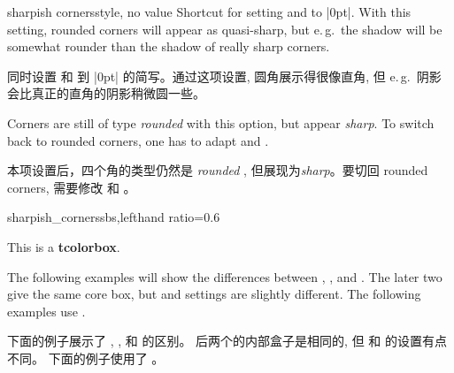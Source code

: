 \begin{docTcbKey}{sharpish corners}{}{style, no value}
Shortcut for setting  and 
to |0pt|. With this setting, rounded corners will appear as quasi-sharp,
but e.\,g.\ the shadow will be somewhat rounder than the shadow
of really sharp corners.

同时设置  和  到 |0pt| 的简写。通过这项设置, 圆角展示得很像直角, 但 e.\,g.\ 阴影会比真正的直角的阴影稍微圆一些。
\begin{marker}
Corners are still of type \emph{rounded} with this option, but appear
\emph{sharp}. To switch back to rounded corners, one has to adapt
 and .

本项设置后，四个角的类型仍然是 \emph{rounded} , 但展现为\emph{sharp}。要切回 rounded corners, 需要修改  和 。
\end{marker}
\begin{exdispExample*}{sharpish_corners}{sbs,lefthand ratio=0.6}
\begin{tcolorbox}[colback=red!5!white,
colframe=red!75!black,
sharpish corners ]
This is a \textbf{tcolorbox}.
\end{tcolorbox}
\end{exdispExample*}
\end{docTcbKey}





The following examples will show the differences between
, , and .
The later two give the same core box, but 
and  settings are slightly different.
The following examples use .

下面的例子展示了 , , 和  的区别。
后两个的内部盒子是相同的, 但  和  的设置有点不同。
下面的例子使用了 。


